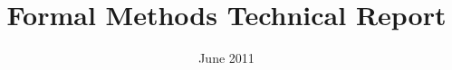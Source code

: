 \documentclass{llncs}
\begin{document}
\mainmatter

%
\pagestyle{plain}
\thispagestyle{plain}


\title{Formal Methods Technical Report}

\date{June 2011}
\maketitle

 
\tableofcontents
\newpage
\listoffigures
\newpage
\listoftables
\newpage

 



\end{document}
